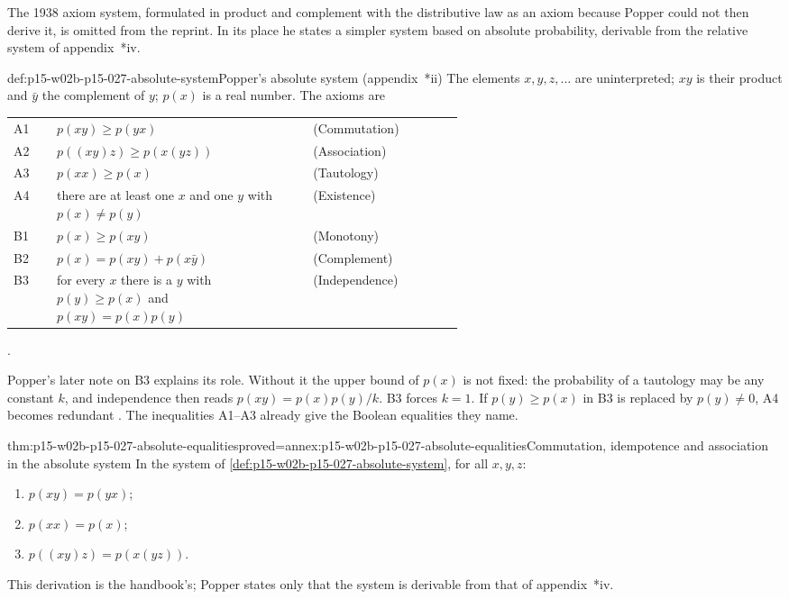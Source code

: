 The 1938 axiom system, formulated in product and complement with the
distributive law as an axiom because Popper could not then derive it, is
omitted from the reprint. In its place he states a simpler system based
on absolute probability, derivable from the relative system of
appendix~*iv.

\begin{hbdefinition}{def:p15-w02b-p15-027-absolute-system}{Popper's absolute system (appendix~*ii)}
The elements \(x,y,z,\ldots\) are uninterpreted; \(xy\) is their product
and \(\bar y\) the complement of \(y\); \(p(x)\) is a real number. The
axioms are
\begin{center}
\begin{tabular}{@{}lp{0.58\linewidth}l@{}}
A1&\(p(xy)\geqslant p(yx)\)&(Commutation)\\
A2&\(p((xy)z)\geqslant p(x(yz))\)&(Association)\\
A3&\(p(xx)\geqslant p(x)\)&(Tautology)\\
A4&there are at least one \(x\) and one \(y\) with \(p(x)\neq p(y)\)&(Existence)\\
B1&\(p(x)\geqslant p(xy)\)&(Monotony)\\
B2&\(p(x)=p(xy)+p(x\bar y)\)&(Complement)\\
B3&for every \(x\) there is a \(y\) with \(p(y)\geqslant p(x)\) and \(p(xy)=p(x)p(y)\)&(Independence)
\end{tabular}
\end{center}
\parencite[appendix~*ii, pp.~320--321]{Popper2002LogicDiscoveryUI}.
\end{hbdefinition}

Popper's later note on B3 explains its role. Without it the upper bound
of \(p(x)\) is not fixed: the probability of a tautology may be any
constant \(k\), and independence then reads \(p(xy)=p(x)p(y)/k\). B3
forces \(k=1\). If \(p(y)\geqslant p(x)\) in B3 is replaced by
\(p(y)\neq0\), A4 becomes redundant
\parencite[appendix~*ii, note~*1, p.~321]{Popper2002LogicDiscoveryUI}.
The inequalities A1--A3 already give the Boolean equalities they name.

\begin{hbtheorem}{thm:p15-w02b-p15-027-absolute-equalities}{proved=annex:p15-w02b-p15-027-absolute-equalities}{Commutation, idempotence and association in the absolute system}
In the system of \cref{def:p15-w02b-p15-027-absolute-system}, for all
\(x,y,z\):
\begin{enumerate}
\item \(p(xy)=p(yx)\);
\item \(p(xx)=p(x)\);
\item \(p((xy)z)=p(x(yz))\).
\end{enumerate}
This derivation is the handbook's; Popper states only that the system is
derivable from that of appendix~*iv.
\end{hbtheorem}

